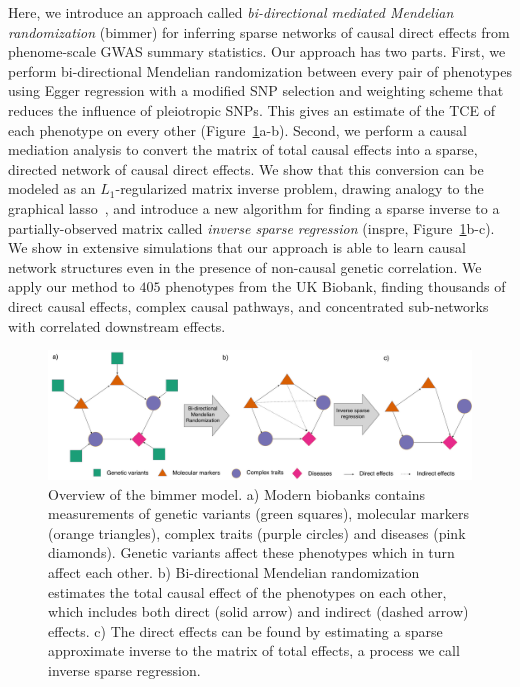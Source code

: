 \documentclass{article}
\begin{document}
Here, we introduce an approach called
\emph{bi-directional mediated Mendelian randomization} (bimmer)
for inferring sparse networks of causal direct effects from phenome-scale
GWAS summary statistics.
Our approach has two parts. First, we perform bi-directional Mendelian randomization
between every pair of phenotypes using Egger regression with a
modified SNP selection and weighting scheme that reduces the
influence of pleiotropic SNPs.
This gives an estimate of the TCE of each phenotype on every other (Figure~\ref{figure0}a-b).
Second,
we perform a causal mediation analysis to convert the matrix
of total causal effects into a sparse, directed network of causal direct effects.
We show that this conversion can be modeled as an $L_1$-regularized matrix inverse problem,
drawing analogy to the graphical lasso~\cite{Friedman2007}, and introduce a new
algorithm for finding a sparse inverse to a partially-observed matrix called
\emph{inverse sparse regression} (inspre, Figure~\ref{figure0}b-c).
We show in extensive simulations that our approach is able to learn causal
 network structures even in the presence of non-causal genetic correlation.
We apply our method to $405$ phenotypes from the UK Biobank, finding thousands
 of direct causal effects, complex causal pathways, and concentrated sub-networks
 with correlated downstream effects.
 
\begin{figure}\label{figure0}
\includegraphics[width=\textwidth]{figures/bimmer_figure1.pdf}
\caption{Overview of the bimmer model. a) Modern biobanks contains measurements of genetic variants (green squares), molecular markers
(orange triangles), complex traits (purple circles) and diseases (pink diamonds). Genetic variants
affect these phenotypes which in turn affect each other. b) Bi-directional Mendelian randomization
estimates the total causal effect of the phenotypes on each other, which includes both
direct (solid arrow) and indirect (dashed arrow) effects. c) The direct effects can be
found by estimating a sparse approximate inverse to the matrix of total effects, a process we
call inverse sparse regression.}
\end{figure}
\end{document}
